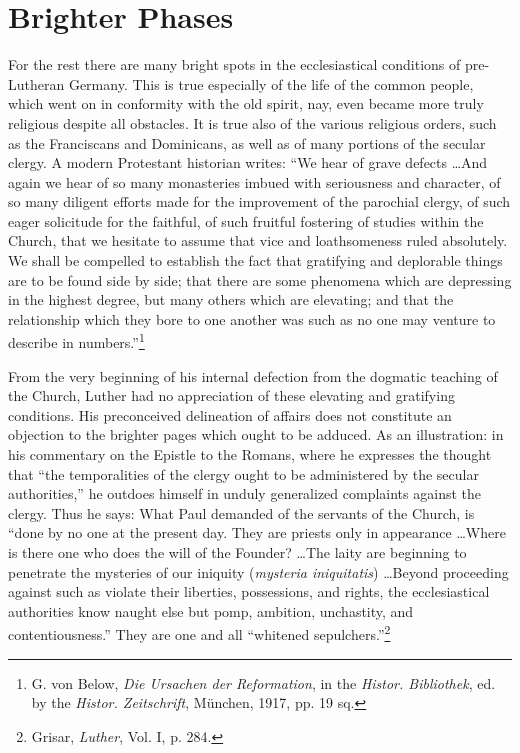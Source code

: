 \section{Brighter Phases}

For the rest there are many bright spots in the ecclesiastical conditions of pre-Lutheran Germany. This is true especially of the life
of the common people, which went on in conformity with the old
spirit, nay, even became more truly religious despite all obstacles. It
is true also of the various religious orders, such as the Franciscans and
Dominicans, as well as of many portions of the secular clergy. A
modern Protestant historian writes: “We hear of grave defects \dots And
again we hear of so many monasteries imbued with seriousness
and character, of so many diligent efforts made for the improvement of
the parochial clergy, of such eager solicitude for the faithful, of such
fruitful fostering of studies within the Church, that we
hesitate to assume that vice and loathsomeness ruled absolutely. We
shall be compelled to establish the fact that gratifying and deplorable
things are to be found side by side; that there are some phenomena
which are depressing in the highest degree, but many others which are
elevating; and that the relationship which they bore to one another
was such as no one may venture to describe in numbers.”\footnote
{G. von Below, \textit{Die Ursachen der Reformation}, in the \textit{Histor. Bibliothek}, ed. by the
\textit{Histor. Zeitschrift}, München, 1917, pp. 19 sq.}

From the very beginning of his internal defection from the dogmatic teaching
of the Church, Luther had no appreciation of these
elevating and gratifying conditions. His preconceived delineation of
affairs does not constitute an objection to the brighter pages which
ought to be adduced.
As an illustration: in his commentary on the Epistle to the Romans,
where he expresses the thought that “the temporalities of the clergy ought
to be administered by the secular authorities,” he outdoes himself in unduly
generalized complaints against the clergy. Thus he says: What Paul demanded
of the servants of the Church, is “done by no one at the present
day. They are priests only in appearance \dots Where is there one who
does the will of the Founder? \dots The laity are beginning to penetrate
the mysteries of our iniquity (\textit{mysteria iniquitatis}) \dots Beyond proceeding
against such as violate their liberties, possessions, and rights, the ecclesiastical
authorities know naught else but pomp, ambition, unchastity, and contentiousness.”
They are one and all “whitened sepulchers.”\footnote{Grisar, \textit{Luther}, Vol. I, p. 284.}

